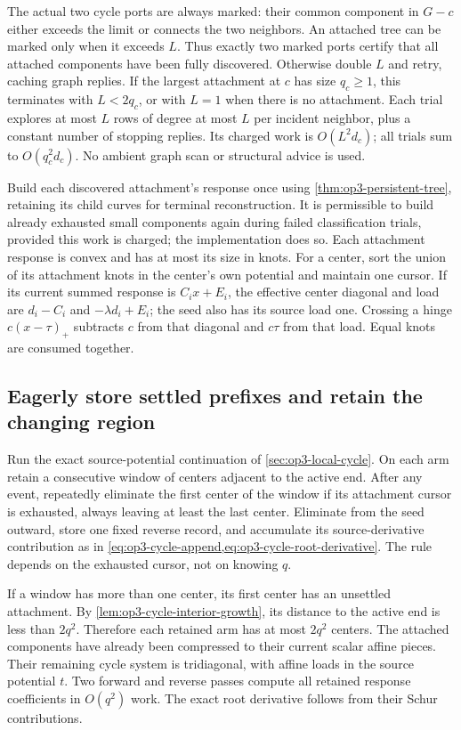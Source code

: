 The actual two cycle ports are always marked: their common component in
$G-c$ either exceeds the limit or connects the two neighbors. An attached
tree can be marked only when it exceeds $L$. Thus exactly two marked
ports certify that all attached components have been fully discovered.
Otherwise double $L$ and retry, caching graph replies. If the largest
attachment at $c$ has size $q_c\geq1$, this terminates with $L<2q_c$,
or with $L=1$ when there is no attachment. Each trial explores at most
$L$ rows of degree at most $L$ per incident neighbor, plus a constant
number of stopping replies. Its charged work is $O(L^2d_c)$; all trials
sum to $O(q_c^2d_c)$. No ambient graph scan or structural advice is used.

Build each discovered attachment's response once using
\cref{thm:op3-persistent-tree}, retaining its child curves for terminal
reconstruction. It is permissible to build already exhausted small
components again during failed classification trials, provided this work
is charged; the implementation does so. Each attachment response is
convex and has at most its size in knots. For a center, sort the union of
its attachment knots in the center's own potential and maintain one cursor.
If its current summed response is $C_i x+E_i$, the effective center
diagonal and load are $d_i-C_i$ and $-\lambda d_i+E_i$; the seed also has
its source load one. Crossing a hinge $c(x-\tau)_+$ subtracts $c$ from
that diagonal and $c\tau$ from that load. Equal knots are consumed together.

\subsection{Eagerly store settled prefixes and retain the changing region}

Run the exact source-potential continuation of
\cref{sec:op3-local-cycle}. On each arm retain a consecutive window of
centers adjacent to the active end. After any event, repeatedly eliminate
the first center of the window if its attachment cursor is exhausted,
always leaving at least the last center. Eliminate from the seed outward,
store one fixed reverse record, and accumulate its source-derivative
contribution as in \cref{eq:op3-cycle-append,eq:op3-cycle-root-derivative}.
The rule depends on the exhausted cursor, not on knowing $q$.

If a window has more than one center, its first center has an unsettled
attachment. By \cref{lem:op3-cycle-interior-growth}, its distance to the
active end is less than $2q^2$. Therefore each retained arm has at most
$2q^2$ centers. The attached components have already been compressed to
their current scalar affine pieces. Their remaining cycle system is
tridiagonal, with affine loads in the source potential $t$. Two forward
and reverse passes compute all retained response coefficients in $O(q^2)$
work. The exact root derivative follows from their Schur contributions.

